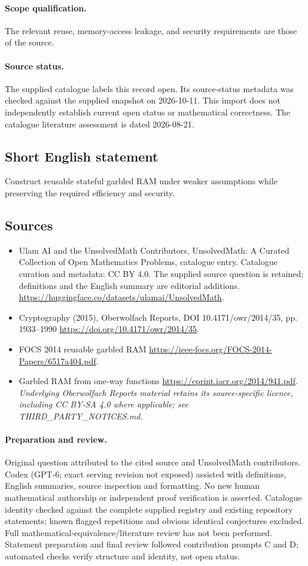\documentclass[11pt]{article}
\begin{document}
\paragraph{Scope qualification.}
The relevant reuse, memory-access leakage, and security requirements are those of the source.
\paragraph{Source status.}
The supplied catalogue labels this record open. Its source-status metadata was checked against the supplied snapshot on 2026-10-11. This import does not independently establish current open status or mathematical correctness. The catalogue literature assessment is dated 2026-08-21.
\subsection{Short English statement}
Construct reusable stateful garbled RAM under weaker assumptions while preserving the required efficiency and security.
\subsection{Sources}
\begin{itemize}
\item[S1] Ulam AI and the UnsolvedMath Contributors, UnsolvedMath: A Curated Collection of Open Mathematics Problems, catalogue entry. Catalogue curation and metadata: CC BY 4.0. The supplied source question is retained; definitions and the English summary are editorial additions.
\url{https://huggingface.co/datasets/ulamai/UnsolvedMath}.
\item[S2] Cryptography (2015), Oberwolfach Reports, DOI 10.4171/owr/2014/35, pp. 1933--1990
\url{https://doi.org/10.4171/owr/2014/35}.
\item[S3] FOCS 2014 reusable garbled RAM
\url{https://ieee-focs.org/FOCS-2014-Papers/6517a404.pdf}.
\item[S4] Garbled RAM from one-way functions
\url{https://eprint.iacr.org/2014/941.pdf}.
\textit{Underlying Oberwolfach Reports material retains its source-specific licence, including CC BY-SA 4.0 where applicable; see THIRD\_PARTY\_NOTICES.md.}
\end{itemize}
\paragraph{Preparation and review.}
Original question attributed to the cited source and UnsolvedMath contributors. Codex (GPT-6; exact serving revision not exposed) assisted with definitions, English summaries, source inspection and formatting. No new human mathematical authorship or independent proof verification is asserted. Catalogue identity checked against the complete supplied registry and existing repository statements; known flagged repetitions and obvious identical conjectures excluded. Full mathematical-equivalence/literature review has not been performed. Statement preparation and final review followed contribution prompts C and D; automated checks verify structure and identity, not open status.
\label{end:statement}
\end{document}
